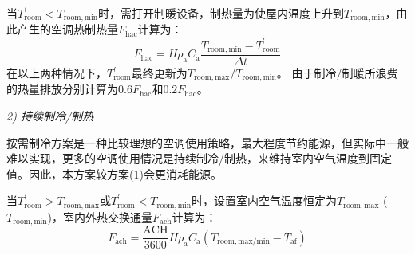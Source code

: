 当$T_{\mathrm{room}}^\prime<T_{\mathrm{room,min}}$时，需打开制暖设备，制热量为使屋内温度上升到$T_{\mathrm{room,min}}$，由此产生的空调热制热量$F_{\mathrm{hac}}$计算为：
\begin{equation}
  F_{\mathrm{h a c}}=H \rho_{\mathrm{a}} C_{\mathrm{a}} \frac{T_{\mathrm{{room,min }}} -T_{\mathrm{{room }}}^{\prime}}{\Delta t}
\end{equation}
在以上两种情况下，$T_{\mathrm{room}}^\prime$最终更新为$T_{\mathrm{room,max}}/T_{\mathrm{room,min}}$。
由于制冷/制暖所浪费的热量排放分别计算为$0.6F_{\mathrm{hac}}$和$0.2F_{\mathrm{hac}}$。

\textit{2) 持续制冷/制热}

按需制冷方案是一种比较理想的空调使用策略，最大程度节约能源，但实际中一般难以实现，更多的空调使用情况是持续制冷/制热，来维持室内空气温度到固定值。因此，本方案较方案(1)会更消耗能源。

当$T_{\mathrm{room}}^\prime>T_{\mathrm{room,max}}$或$T_{\mathrm{room}}^\prime<T_{\mathrm{room,min}}$时，设置室内空气温度恒定为$T_{\mathrm{room,max}}$ \allowbreak($T_{\mathrm{room,min}}$)，室内外热交换通量$F_{\mathrm{ach}}$计算为：
\begin{equation}
  F_{\mathrm{a c h}}=\frac{\mathrm {ACH}}{3600} H \rho_{\mathrm{a}} C_{\mathrm{a}}\left(T_{\mathrm{{room,max/min}}}-T_{\mathrm{a f}}\right)
\end{equation}

